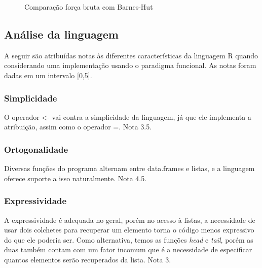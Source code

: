 \documentclass[rel_mlp]{iiufrgs}
\begin{document}
\begin{figure}[htb]
    \centering
    \caption{Comparação força bruta com Barnes-Hut}
    \label{fig:grafico}
\end{figure}



\subsection{Análise da linguagem}

A seguir são atribuídas notas às diferentes características da linguagem R quando considerando uma implementação usando o paradigma funcional. As notas foram dadas em um intervalo [0,5].

\subsubsection{Simplicidade}
O operador <- vai contra a simplicidade da linguagem, já que ele implementa a atribuição, assim como o operador =. Nota 3.5.

\subsubsection{Ortogonalidade}
Diversas funções do programa alternam entre data.frames e listas, e a linguagem oferece suporte a isso naturalmente. Nota 4.5.

\subsubsection{Expressividade}
A expressividade é adequada no geral, porém no acesso à listas, a necessidade de usar dois colchetes para recuperar um elemento torna o código menos expressivo do que ele poderia ser. Como alternativa, temos as funções \textit{head} e \textit{tail}, porém as duas também contam com um fator incomum que é a necessidade de especificar quantos elementos serão recuperados da lista. Nota 3.
\end{document}
